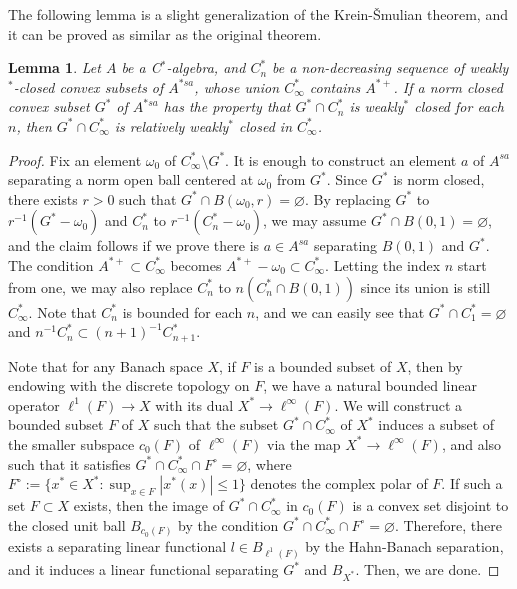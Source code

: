 \documentclass[a4paper]{amsart}
\theoremstyle{plain}
\newtheorem{lem}[thm]{Lemma}
\theoremstyle{definition}
\begin{document}
The following lemma is a slight generalization of the Krein-\v Smulian theorem, and it can be proved as similar as the original theorem.
\begin{lem}
Let $A$ be a C$^*$-algebra, and $C^*_n$ be a non-decreasing sequence of weakly$^*$-closed convex subsets of $A^{*sa}$, whose union $C_\infty^*$ contains $A^{*+}$.
If a norm closed convex subset $G^*$ of $A^{*sa}$ has the property that $G^*\cap C^*_n$ is weakly$^*$ closed for each $n$, then $G^*\cap C_\infty^*$ is relatively weakly$^*$ closed in $C_\infty^*$.
\end{lem}
\begin{proof}
Fix an element $\omega_0$ of $C_\infty^*\setminus G^*$.
It is enough to construct an element $a$ of $A^{sa}$ separating a norm open ball centered at $\omega_0$ from $G^*$.
Since $G^*$ is norm closed, there exists $r>0$ such that $G^*\cap B(\omega_0,r)=\varnothing$.
By replacing $G^*$ to $r^{-1}(G^*-\omega_0)$ and $C_n^*$ to $r^{-1}(C_n^*-\omega_0)$, we may assume $G^*\cap B(0,1)=\varnothing$, and the claim follows if we prove there is $a\in A^{sa}$ separating $B(0,1)$ and $G^*$.
The condition $A^{*+}\subset C_\infty^*$ becomes $A^{*+}-\omega_0\subset C_\infty^*$.
Letting the index $n$ start from one, we may also replace $C_n^*$ to $n(C_n^*\cap B(0,1))$ since its union is still $C_\infty^*$.
Note that $C_n^*$ is bounded for each $n$, and we can easily see that $G^*\cap C_1^*=\varnothing$ and $n^{-1}C_n^*\subset(n+1)^{-1}C_{n+1}^*$.

Note that for any Banach space $X$, if $F$ is a bounded subset of $X$, then by endowing with the discrete topology on $F$, we have a natural bounded linear operator $\ell^1(F)\to X$ with its dual $X^*\to\ell^\infty(F)$.
We will construct a bounded subset $F$ of $X$ such that the subset $G^*\cap C_\infty^*$ of $X^*$ induces a subset of the smaller subspace $c_0(F)$ of $\ell^\infty(F)$ via the map $X^*\to\ell^\infty(F)$, and also such that it satisfies $G^*\cap C_\infty^*\cap F^\circ=\varnothing$, where $F^\circ:=\{x^*\in X^*:\sup_{x\in F}|x^*(x)|\le1\}$ denotes the complex polar of $F$.
If such a set $F\subset X$ exists, then the image of $G^*\cap C_\infty^*$ in $c_0(F)$ is a convex set disjoint to the closed unit ball $B_{c_0(F)}$ by the condition $G^*\cap C_\infty^*\cap F^\circ=\varnothing$.
Therefore, there exists a separating linear functional $l\in B_{\ell^1(F)}$ by the Hahn-Banach separation, and it induces a linear functional separating $G^*$ and $B_{X^*}$.
Then, we are done.


\end{proof}
\end{document}
